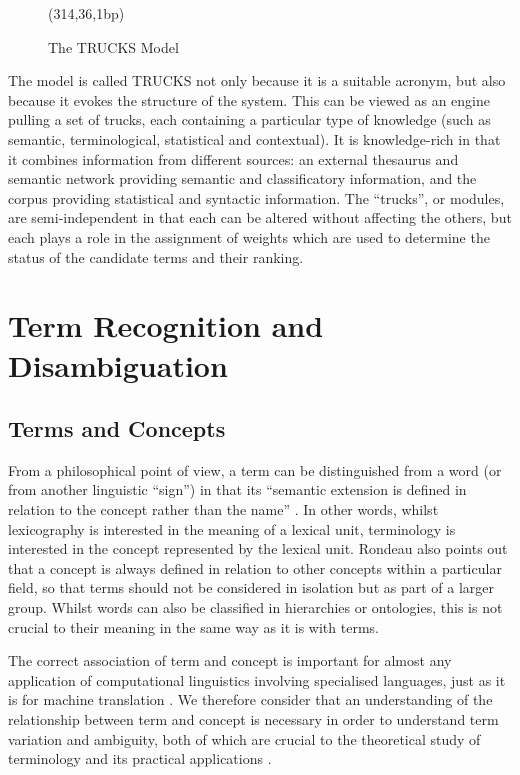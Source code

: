 \begin{figure*}[htbp]
\begin{center}
\begin{epsf}
\end{epsf}
\begin{draft}
\atari(314,36,1bp)
\end{draft}
\end{center}
\caption{The TRUCKS Model}
\label{fig:trucks}
\end{figure*}

The model is called TRUCKS not only because it is a suitable acronym,
but also because it evokes the structure of the system. This can be
viewed as an engine pulling a set of trucks, each containing a
particular type of knowledge (such as semantic, terminological,
statistical and contextual). It is knowledge-rich in that it combines
information from different sources: an external thesaurus and semantic
network providing semantic and classificatory information, and the
corpus providing statistical and syntactic information. The ``trucks'', or modules, are
semi-independent in that each can be altered without affecting the
others, but each plays a role in the assignment of weights which are
used to determine the status of the candidate terms and their ranking.

\section{Term Recognition and Disambiguation}

\subsection{Terms and Concepts}
From a philosophical point of view, a term can be distinguished from a
word (or from another linguistic ``sign'') in that its ``semantic
extension is defined in relation to the concept rather than the name''
\cite{Rondeau80}. In other words, whilst lexicography is interested in
the meaning of a lexical unit, terminology is interested in the
concept represented by the lexical unit. Rondeau also points out that
a concept is always defined in relation to other concepts within a
particular field, so that terms should not be considered in isolation
but as part of a larger group. Whilst words can also be classified in
hierarchies or ontologies, this is not crucial to their meaning in the
same way as it is with terms.

The correct association of term and concept is important for almost
any application of computational linguistics involving specialised
languages, just as it is for machine translation \cite{Dubuc97}. We
therefore consider that an understanding of the relationship between
term and concept is necessary in order to understand term variation
and ambiguity, both of which are crucial to the theoretical
study of terminology and its practical applications
\cite{Maynard98b}. 

